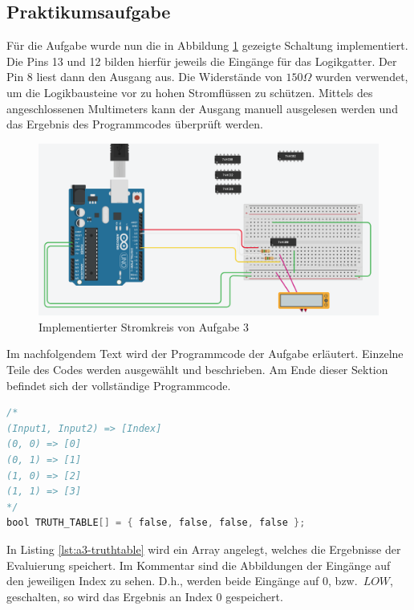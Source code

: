 \subsection{Praktikumsaufgabe}
\label{subsec:a3-praktikumsaufgabe2}

Für die Aufgabe wurde nun die in Abbildung \ref{fig:a3-implementiert} gezeigte Schaltung implementiert.
Die Pins 13 und 12 bilden hierfür jeweils die Eingänge für das Logikgatter.
Der Pin 8 liest dann den Ausgang aus.
Die Widerstände von $150\Omega$ wurden verwendet, um die Logikbausteine vor zu hohen Stromflüssen zu schützen.
Mittels des angeschlossenen Multimeters kann der Ausgang manuell ausgelesen werden und das Ergebnis des Programmcodes überprüft werden.

\begin{figure}[ht]
    \centering
    \includegraphics[width=\textwidth]{pictures/a3-praktik.png}
    \caption{Implementierter Stromkreis von Aufgabe 3}
    \label{fig:a3-implementiert}
\end{figure}

Im nachfolgendem Text wird der Programmcode der Aufgabe erläutert.
Einzelne Teile des Codes werden ausgewählt und beschrieben.
Am Ende dieser Sektion befindet sich der vollständige Programmcode.

\begin{lstlisting}[language=C,label={lst:a3-truthtable}, caption={Variable für die Wahrheitstabelle}]
/*
(Input1, Input2) => [Index]
(0, 0) => [0]
(0, 1) => [1]
(1, 0) => [2]
(1, 1) => [3]
*/
bool TRUTH_TABLE[] = { false, false, false, false };
\end{lstlisting}

In Listing \ref{lst:a3-truthtable} wird ein Array angelegt, welches die Ergebnisse der Evaluierung speichert.
Im Kommentar sind die Abbildungen der Eingänge auf den jeweiligen Index zu sehen.
D.h., werden beide Eingänge auf 0, bzw.\ $LOW$, geschalten, so wird das Ergebnis an Index 0 gespeichert.

